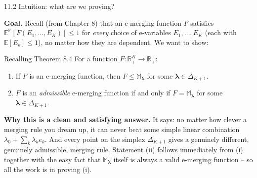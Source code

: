 \documentclass[aspectratio=169,10pt]{beamer}
\newcommand{\PP}{\mathbb{P}}
\newcommand{\EE}{\mathbb{E}}
\newcommand{\RR}{\mathbb{R}}
\newcommand{\1}{\mathbb{1}}
\begin{document}
\begin{frame}[allowframebreaks]{11.2 Intuition: what are we proving?}

\textbf{Goal.} Recall (from Chapter 8) that an e-merging function $F$ satisfies $\EE^{\PP}[F(E_1,\dots,E_K)] \le 1$ for \emph{every} choice of e-variables $E_1,\dots,E_K$ (each with $\EE[E_k]\le 1$), no matter how they are dependent. We want to show:

\begin{block}{Recalling Theorem 8.4}
For a function $F:\RR_+^K \to \RR_+$:
\begin{enumerate}
\item[(i)] If $F$ is an e-merging function, then $F \le \mathbb{M}_{\boldsymbol\lambda}$ for some $\boldsymbol\lambda \in \Delta_{K+1}$.
\item[(ii)] $F$ is an \emph{admissible} e-merging function if and only if $F = \mathbb{M}_{\boldsymbol\lambda}$ for some $\boldsymbol\lambda \in \Delta_{K+1}$.
\end{enumerate}
\end{block}

\textbf{Why this is a clean and satisfying answer.} It says: no matter how clever a merging rule you dream up, it can never beat some simple linear combination $\lambda_0 + \sum_k \lambda_k e_k$. And every point on the simplex $\Delta_{K+1}$ gives a genuinely different, genuinely admissible, merging rule. Statement (ii) follows immediately from (i) together with the easy fact that $\mathbb{M}_{\boldsymbol\lambda}$ itself is always a valid e-merging function -- so all the work is in proving (i).

\end{frame}
\end{document}
